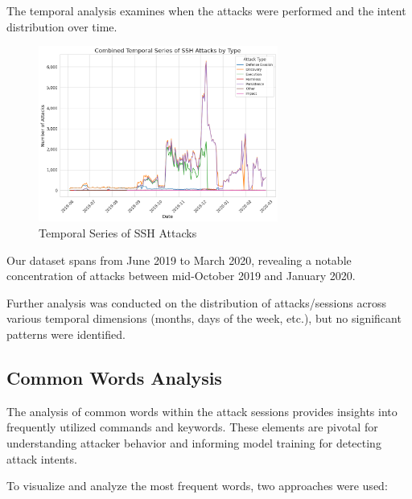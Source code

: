         The temporal analysis examines when the attacks were performed and the intent distribution over time.
        
        \begin{figure}[H]
            \centering
            \includegraphics[width=0.70\textwidth]{../figures/plots/section1/combined_temporal_series_of_ssh_attacks_by_type.png}
            \caption{Temporal Series of SSH Attacks}
            \label{fig:temporal-analysis}
        \end{figure}
        
        Our dataset spans from June 2019 to March 2020, revealing a notable concentration of attacks between mid-October 2019 and January 2020.

        Further analysis was conducted on the distribution of attacks/sessions across various temporal dimensions (months, days of the week, etc.), but no significant patterns were identified.
        

    \subsection{Common Words Analysis}
    
        The analysis of common words within the attack sessions provides insights into frequently utilized commands and keywords. These elements are pivotal for understanding attacker behavior and informing model training for detecting attack intents. 

        To visualize and analyze the most frequent words, two approaches were used: 
        

